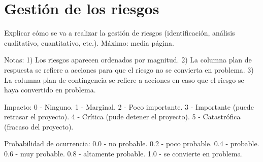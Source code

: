 \section{Gestión de los riesgos}
Explicar cómo se va a realizar la gestión de riesgos (identificación, análisis cualitativo, cuantitativo, etc.). 
Máximo: media página.



Notas: 
1) Los riesgos aparecen ordenados por magnitud.
2) La columna plan de respuesta se refiere a acciones para que el riesgo no se convierta en problema.
3) La columna plan de contingencia se refiere a acciones en caso que el riesgo se haya convertido en problema.	

Impacto: 
0 - Ninguno.
1 - Marginal.
2 - Poco importante.
3 - Importante (puede retrasar el proyecto).
4 - Crítica (pude detener el proyecto).
5 - Catastrófica (fracaso del proyecto).	

Probabilidad de ocurrencia:
0.0 - no probable.
0.2 - poco probable.
0.4 - probable.
0.6 - muy probable.
0.8 - altamente probable.
1.0 - se convierte en problema.
